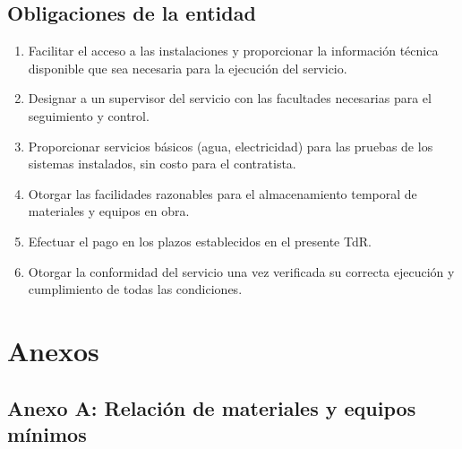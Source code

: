 \documentclass[12pt,a4paper]{article}
\begin{document}
\subsection{Obligaciones de la entidad}

\begin{enumerate}
  \item Facilitar el acceso a las instalaciones y proporcionar la información técnica disponible que sea necesaria para la ejecución del servicio.
  \item Designar a un supervisor del servicio con las facultades necesarias para el seguimiento y control.
  \item Proporcionar servicios básicos (agua, electricidad) para las pruebas de los sistemas instalados, sin costo para el contratista.
  \item Otorgar las facilidades razonables para el almacenamiento temporal de materiales y equipos en obra.
  \item Efectuar el pago en los plazos establecidos en el presente TdR.
  \item Otorgar la conformidad del servicio una vez verificada su correcta ejecución y cumplimiento de todas las condiciones.
\end{enumerate}

\section{Anexos}

\subsection{Anexo A: Relación de materiales y equipos mínimos}
\end{document}

